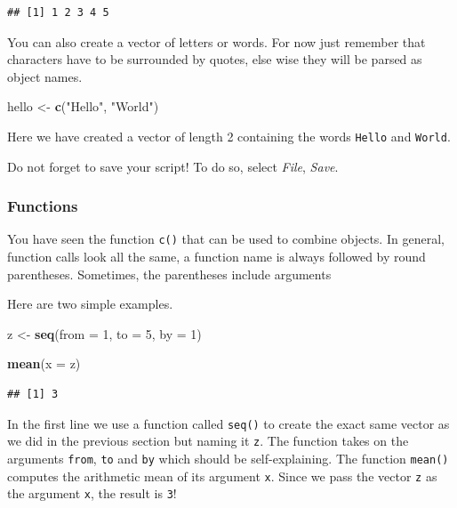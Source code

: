 \documentclass[]{book}
\newenvironment{Shaded}{\begin{snugshade}}{\end{snugshade}}
\newcommand{\KeywordTok}[1]{\textcolor[rgb]{0.13,0.29,0.53}{\textbf{#1}}}
\newcommand{\DataTypeTok}[1]{\textcolor[rgb]{0.13,0.29,0.53}{#1}}
\newcommand{\DecValTok}[1]{\textcolor[rgb]{0.00,0.00,0.81}{#1}}
\newcommand{\StringTok}[1]{\textcolor[rgb]{0.31,0.60,0.02}{#1}}
\newcommand{\NormalTok}[1]{#1}
\theoremstyle{definition}
\theoremstyle{definition}
\theoremstyle{definition}
\theoremstyle{remark}
\begin{document}
\begin{verbatim}
## [1] 1 2 3 4 5
\end{verbatim}

You can also create a vector of letters or words. For now just remember
that characters have to be surrounded by quotes, else wise they will be
parsed as object names.

\begin{Shaded}
\begin{Highlighting}[]
\NormalTok{hello <-}\StringTok{ }\KeywordTok{c}\NormalTok{(}\StringTok{"Hello"}\NormalTok{, }\StringTok{"World"}\NormalTok{)}
\end{Highlighting}
\end{Shaded}

Here we have created a vector of length 2 containing the words
\texttt{Hello} and \texttt{World}.

Do not forget to save your script! To do so, select \emph{File},
\emph{Save}.

\subsubsection*{Functions}\label{functions}

You have seen the function \texttt{c()} that can be used to combine
objects. In general, function calls look all the same, a function name
is always followed by round parentheses. Sometimes, the parentheses
include arguments

Here are two simple examples.

\begin{Shaded}
\begin{Highlighting}[]
\NormalTok{z <-}\StringTok{ }\KeywordTok{seq}\NormalTok{(}\DataTypeTok{from =} \DecValTok{1}\NormalTok{, }\DataTypeTok{to =} \DecValTok{5}\NormalTok{, }\DataTypeTok{by =} \DecValTok{1}\NormalTok{)}

\KeywordTok{mean}\NormalTok{(}\DataTypeTok{x =}\NormalTok{ z)}
\end{Highlighting}
\end{Shaded}

\begin{verbatim}
## [1] 3
\end{verbatim}

In the first line we use a function called \texttt{seq()} to create the
exact same vector as we did in the previous section but naming it
\texttt{z}. The function takes on the arguments \texttt{from},
\texttt{to} and \texttt{by} which should be self-explaining. The
function \texttt{mean()} computes the arithmetic mean of its argument
\texttt{x}. Since we pass the vector \texttt{z} as the argument
\texttt{x}, the result is \texttt{3}!
\end{document}
